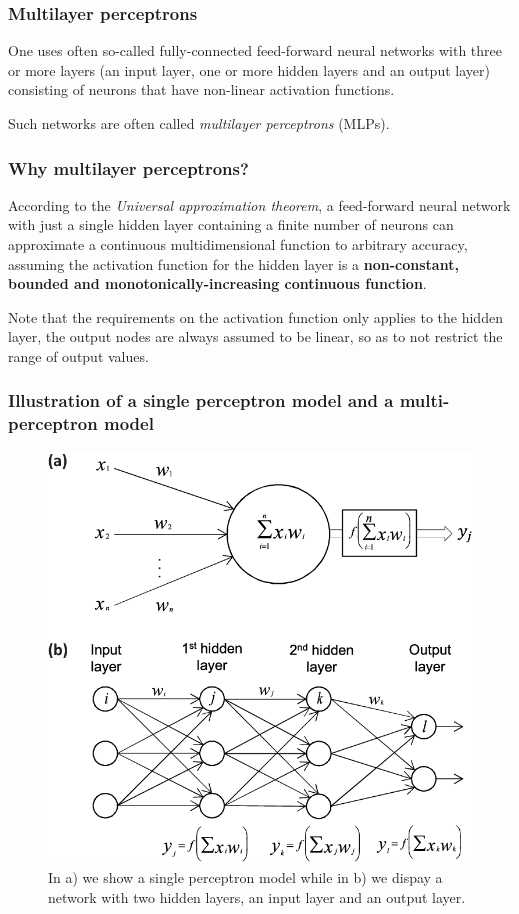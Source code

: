 \documentclass{beamer}
\begin{document}
\begin{frame}
\frametitle{Multilayer perceptrons}

One uses often so-called fully-connected feed-forward neural networks
with three or more layers (an input layer, one or more hidden layers
and an output layer) consisting of neurons that have non-linear
activation functions.

Such networks are often called \emph{multilayer perceptrons} (MLPs).
\end{frame}

\begin{frame}
\frametitle{Why multilayer perceptrons?}

According to the \emph{Universal approximation theorem}, a feed-forward
neural network with just a single hidden layer containing a finite
number of neurons can approximate a continuous multidimensional
function to arbitrary accuracy, assuming the activation function for
the hidden layer is a \textbf{non-constant, bounded and
monotonically-increasing continuous function}.

Note that the requirements on the activation function only applies to
the hidden layer, the output nodes are always assumed to be linear, so
as to not restrict the range of output values.
\end{frame}

\begin{frame}
\frametitle{Illustration of a single perceptron model and a multi-perceptron model}

\begin{figure}[!ht]  %
  \centerline{\includegraphics[width=0.8\linewidth]{figures/nns.png}}
  \caption{
  In a) we show a single perceptron model while in b) we dispay a network with two  hidden layers, an input layer and an output layer.
  }
\end{figure}
\end{frame}
\end{document}
